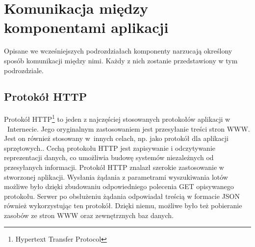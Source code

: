 \documentclass[12pt, twoside]{report}
\begin{document}
\section{Komunikacja między komponentami aplikacji}
Opisane we wcześniejszych podrozdziałach komponenty narzucają określony sposób komunikacji między nimi. Każdy z nich zostanie przedstawiony w tym podrozdziale.

\subsection{Protokół HTTP}
Protokół HTTP\footnote{Hypertext Transfer Protocol} to jeden z najczęściej stosowanych  protokołów aplikacji w ~Internecie. Jego oryginalnym zastosowaniem jest przesyłanie treści stron WWW. Jest on również stosowany w~innych celach, np. jako protokół dla aplikacji sprzętowych.\cite{http}. Cechą protokołu HTTP jest zapisywanie i odczytywanie reprezentacji danych, co umożliwia budowę systemów niezależnych od przesyłanych informacji. Protokół HTTP znalazł szerokie zastosowanie w stworzonej aplikacji. Wysłania żądania z parametrami wyszukiwania lotów możliwe było dzięki zbudowaniu odpowiedniego polecenia GET opisywanego protokołu. Serwer po obsłużeniu żądania odpowiadał treścią w formacie JSON również wykorzystując ten protokół. Dzięki niemu, możliwe było też pobieranie zasobów ze stron WWW oraz zewnętrznych baz danych.
 

\end{document}
